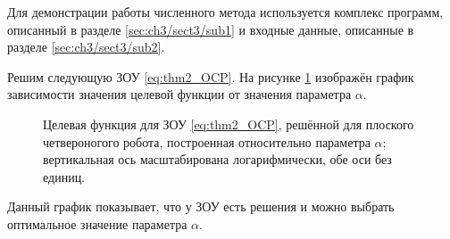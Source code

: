 Для демонстрации работы численного метода используется комплекс программ, описанный в разделе \ref{sec:ch3/sect3/sub1} и входные данные, описанные в разделе \ref{sec:ch3/sect3/sub2}.

Решим следующую ЗОУ \eqref{eq:thm2_OCP}.
%
На рисунке \ref{fig:output_cost} изображён график зависимости значения целевой функции от значения параметра $\alpha$. 
\begin{figure}[ht]
	\caption{Целевая функция для ЗОУ \eqref{eq:thm2_OCP}, решённой для плоского четвероногого робота, построенная относительно параметра $\alpha$; вертикальная ось масштабирована логарифмически, обе оси без единиц.} \label{fig:output_cost}
\end{figure}
 Данный график показывает, что у ЗОУ есть решения и можно выбрать оптимальное значение параметра $\alpha$.

